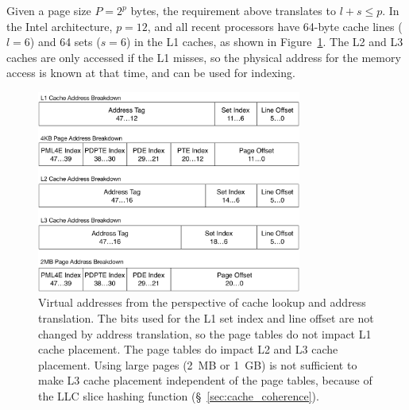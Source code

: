 Given a page size $P = 2^{p}$ bytes, the requirement above translates to
$l + s \le p$. In the Intel architecture, $p = 12$, and all recent processors
have 64-byte cache lines ($l = 6$) and 64 sets ($s = 6$) in the L1 caches, as
shown in Figure~\ref{fig:caching_and_paging}. The L2 and L3 caches are only
accessed if the L1 misses, so the physical address for the memory access is
known at that time, and can be used for indexing.

\begin{figure}[hbt]
  \centering
  \includegraphics[width=87mm]{figures/caching_and_paging.pdf}
  \caption{
    Virtual addresses from the perspective of cache lookup and address
    translation. The bits used for the L1 set index and line offset are not
    changed by address translation, so the page tables do not impact L1 cache
    placement. The page tables do impact L2 and L3 cache placement. Using large
    pages (2~MB or 1~GB) is not sufficient to make L3 cache placement
    independent of the page tables, because of the LLC slice hashing function
    (\S~\ref{sec:cache_coherence}).
  }
  \label{fig:caching_and_paging}
\end{figure}

